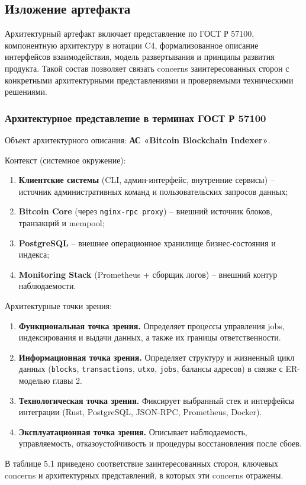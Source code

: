 ﻿\documentclass[14pt,a4paper]{extarticle}
\begin{document}
\subsection{Изложение артефакта}
\noindent Архитектурный артефакт включает представление по ГОСТ Р 57100, компонентную архитектуру в нотации C4, формализованное описание интерфейсов взаимодействия, модель развертывания и принципы развития продукта. Такой состав позволяет связать concerns заинтересованных сторон с конкретными архитектурными представлениями и проверяемыми техническими решениями.

\subsubsection{Архитектурное представление в терминах ГОСТ Р 57100}
\noindent Объект архитектурного описания: \textbf{АС «Bitcoin Blockchain Indexer»}.

\noindent Контекст (системное окружение):
\begin{enumerate}
  \item \textbf{Клиентские системы} (CLI, админ-интерфейс, внутренние сервисы) -- источник административных команд и пользовательских запросов данных;
  \item \textbf{Bitcoin Core} (через \texttt{nginx-rpc proxy}) -- внешний источник блоков, транзакций и mempool;
  \item \textbf{PostgreSQL} -- внешнее операционное хранилище бизнес-состояния и индекса;
  \item \textbf{Monitoring Stack} (Prometheus + сборщик логов) -- внешний контур наблюдаемости.
\end{enumerate}

\noindent Архитектурные точки зрения:
\begin{enumerate}
  \item \textbf{Функциональная точка зрения.} Определяет процессы управления jobs, индексирования и выдачи данных, а также их границы ответственности.
  \item \textbf{Информационная точка зрения.} Определяет структуру и жизненный цикл данных (\texttt{blocks}, \texttt{transactions}, \texttt{utxo}, \texttt{jobs}, балансы адресов) в связке с ER-моделью главы 2.
  \item \textbf{Технологическая точка зрения.} Фиксирует выбранный стек и интерфейсы интеграции (Rust, PostgreSQL, JSON-RPC, Prometheus, Docker).
  \item \textbf{Эксплуатационная точка зрения.} Описывает наблюдаемость, управляемость, отказоустойчивость и процедуры восстановления после сбоев.
\end{enumerate}
\noindent В таблице 5.1 приведено соответствие заинтересованных сторон, ключевых concerns и архитектурных представлений, в которых эти concerns отражены.
\end{document}

